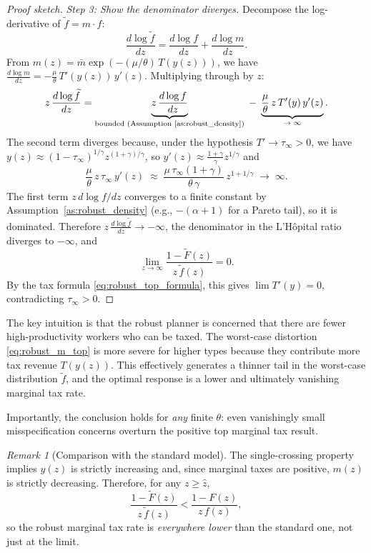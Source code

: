 \documentclass[12pt,a4paper]{article}
\theoremstyle{definition}
\theoremstyle{plain}
\theoremstyle{remark}
\newtheorem{remark}{Remark}[section]
\begin{document}
\begin{proof}[Proof sketch]
\emph{Step 3: Show the denominator diverges.} Decompose the log-derivative of $\widetilde{f} = m \cdot f$:
\[
  \frac{d\log\widetilde{f}}{dz} = \frac{d\log f}{dz} + \frac{d\log m}{dz}.
\]
From $m(z) = \bar{m}\exp(-(\mu/\theta)\,T(y(z)))$, we have $\frac{d\log m}{dz} = -\frac{\mu}{\theta}\,T'(y(z))\,y'(z)$. Multiplying through by $z$:
\[
  z\,\frac{d\log\widetilde{f}}{dz} = \underbrace{z\,\frac{d\log f}{dz}}_{\text{bounded (Assumption~\ref{as:robust_density})}} \;-\; \underbrace{\frac{\mu}{\theta}\,z\,T'(y)\,y'(z)}_{\to\;\infty}.
\]
The second term diverges because, under the hypothesis $T' \to \tau_\infty > 0$, we have $y(z) \approx (1-\tau_\infty)^{1/\gamma}z^{(1+\gamma)/\gamma}$, so $y'(z) \approx \frac{1+\gamma}{\gamma}z^{1/\gamma}$ and
\[
  \frac{\mu}{\theta}\,z\,\tau_\infty\,y'(z) \;\approx\; \frac{\mu\,\tau_\infty(1+\gamma)}{\theta\,\gamma}\,z^{1+1/\gamma} \;\to\; \infty.
\]
The first term $z\,d\log f/dz$ converges to a finite constant by Assumption~\ref{as:robust_density} (e.g., $-(\alpha+1)$ for a Pareto tail), so it is dominated. Therefore $z\,\frac{d\log\widetilde{f}}{dz} \to -\infty$, the denominator in the L'H\^{o}pital ratio diverges to $-\infty$, and
\[
  \lim_{z \to \infty} \frac{1 - \widetilde{F}(z)}{z\,\widetilde{f}(z)} = 0.
\]
By the tax formula \eqref{eq:robust_top_formula}, this gives $\lim T'(y) = 0$, contradicting $\tau_\infty > 0$.
\end{proof}

The key intuition is that the robust planner is concerned that there are fewer high-productivity workers who can be taxed. The worst-case distortion \eqref{eq:robust_m_top} is more severe for higher types because they contribute more tax revenue $T(y(z))$. This effectively generates a thinner tail in the worst-case distribution $\widetilde{f}$, and the optimal response is a lower and ultimately vanishing marginal tax rate.

Importantly, the conclusion holds for \emph{any} finite $\theta$: even vanishingly small misspecification concerns overturn the positive top marginal tax result.

\begin{remark}[Comparison with the standard model]
The single-crossing property implies $y(z)$ is strictly increasing and, since marginal taxes are positive, $m(z)$ is strictly decreasing. Therefore, for any $z \geq \hat{z}$,
\[
  \frac{1 - \widetilde{F}(z)}{z\, \widetilde{f}(z)} < \frac{1-F(z)}{z\, f(z)},
\]
so the robust marginal tax rate is \emph{everywhere lower} than the standard one, not just at the limit.
\end{remark}
\end{document}
